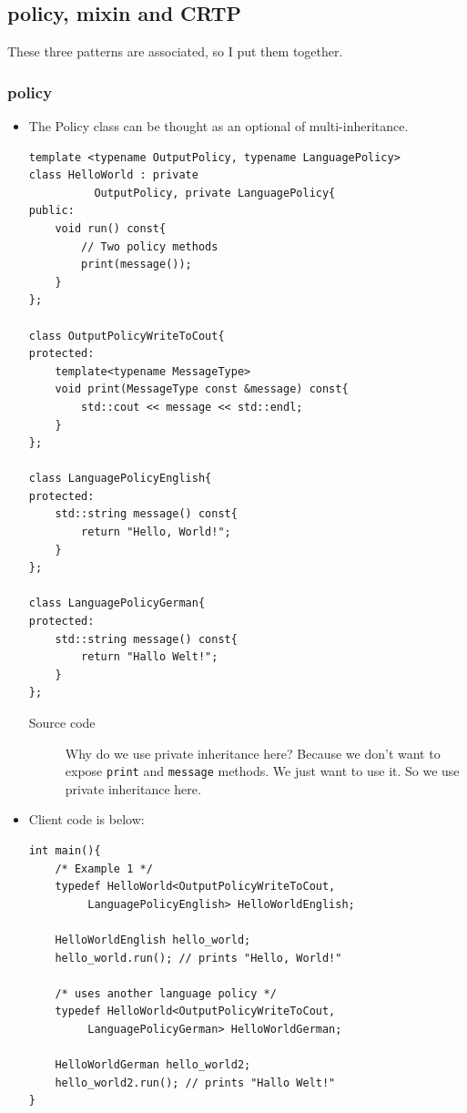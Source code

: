 \documentclass[a4paper,11pt,twoside]{book}
\begin{document}
\subsection{policy, mixin and CRTP}
These three patterns are associated, so I put them together. 

\subsubsection{policy}
\begin{itemize}
	
	\item The Policy class can be thought as an optional of multi-inheritance. 
	
\begin{lstlisting}[numbers=none]
template <typename OutputPolicy, typename LanguagePolicy>
class HelloWorld : private 
          OutputPolicy, private LanguagePolicy{
public:
	void run() const{
		// Two policy methods
		print(message());
	}
};
	
class OutputPolicyWriteToCout{
protected:
	template<typename MessageType>
	void print(MessageType const &message) const{
		std::cout << message << std::endl;
	}
};
	
class LanguagePolicyEnglish{
protected:
	std::string message() const{
		return "Hello, World!";
	}
};
	
class LanguagePolicyGerman{
protected:
	std::string message() const{
		return "Hallo Welt!";
	}
};
\end{lstlisting}
\begin{description}
    \item[Source code] Why do we use private inheritance here? Because we don't want to expose \texttt{print} and \texttt{message} methods. We just want to use it. So we use private inheritance here.
\end{description}
\item Client code is below:
\begin{lstlisting}[numbers=none]
int main(){
	/* Example 1 */
	typedef HelloWorld<OutputPolicyWriteToCout, 
	     LanguagePolicyEnglish> HelloWorldEnglish;
	
	HelloWorldEnglish hello_world;
	hello_world.run(); // prints "Hello, World!"
	
	/* uses another language policy */
	typedef HelloWorld<OutputPolicyWriteToCout, 
	     LanguagePolicyGerman> HelloWorldGerman;
	
	HelloWorldGerman hello_world2;
	hello_world2.run(); // prints "Hallo Welt!"
}
\end{lstlisting}
	


\end{itemize}
\end{document}
